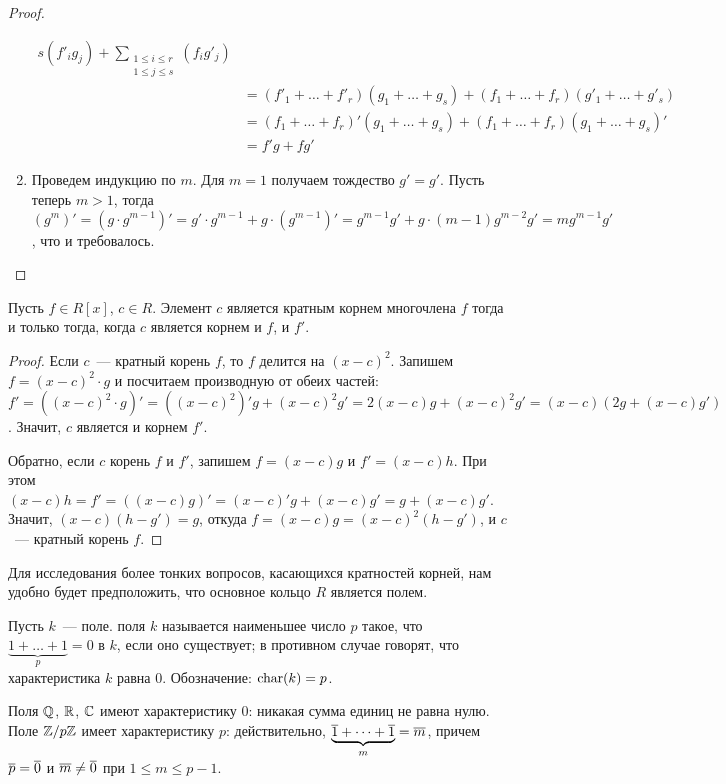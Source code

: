 \begin{proof}
\begin{enumerate}
\begin{align*}
{{    s}}(f'_ig_j) + \sum_{\substack{1\leq i\leq r\\1\leq
    j\leq s}}(f_ig'_j)\\
&=(f'_1+\dots+f'_r)(g_1+\dots+g_s)+(f_1+\dots+f_r)(g'_1+\dots+g'_s)\\
&=(f_1+\dots+f_r)'(g_1+\dots+g_s)+(f_1+\dots+f_r)(g_1+\dots+g_s)'\\
&=f'g+fg'
\end{align*}
\item Проведем индукцию по $m$. Для $m=1$ получаем тождество $g'=g'$.
Пусть теперь $m>1$, тогда $(g^m)'=(g\cdot g^{m-1})'=g'\cdot g^{m-1}
+ g\cdot (g^{m-1})'=g^{m-1}g'+g\cdot (m-1)g^{m-2}g'=mg^{m-1}g'$, что и
требовалось.
\end{enumerate}
\end{proof}

\begin{proposition}\label{prop_roots_and_derivative}
Пусть $f\in R[x]$, $c\in R$. Элемент $c$ является кратным корнем
многочлена $f$ тогда и только тогда, когда $c$ является корнем и $f$,
и $f'$.
\end{proposition}
\begin{proof}
Если $c$~--- кратный корень $f$, то $f$ делится на $(x-c)^2$. Запишем
$f=(x-c)^2\cdot g$ и посчитаем производную от обеих частей:
$f'=((x-c)^2\cdot g)' = ((x-c)^2)'g+(x-c)^2g' = 2(x-c)g+(x-c)^2g' =
(x-c)(2g+(x-c)g')$.
Значит, $c$ является и корнем $f'$.

Обратно, если $c$ корень $f$ и $f'$, запишем $f=(x-c)g$ и $f'=(x-c)h$.
При этом $(x-c)h=f'=((x-c)g)'=(x-c)'g+(x-c)g'=g+(x-c)g'$. Значит,
$(x-c)(h-g')=g$, откуда $f=(x-c)g=(x-c)^2(h-g')$, и $c$~--- кратный
корень $f$.
\end{proof}

Для исследования более тонких вопросов, касающихся кратностей корней,
нам удобно будет предположить, что основное кольцо $R$ является полем.

\begin{definition}
Пусть $k$~--- поле. 
поля $k$ называется
наименьшее число $p$ такое, что $\underbrace{1+\dots+1}_{p}=0$ в $k$,
если оно существует; в противном случае говорят, что характеристика
$k$ равна $0$. Обозначение: $\operatorname{char}(k)=p$.
\end{definition}

\begin{examples}
Поля $\mathbb Q$, $\mathbb R$, $\mathbb C$ имеют характеристику $0$: никакая сумма
единиц не равна нулю. Поле $\mathbb
Z/p\mathbb Z$ имеет характеристику $p$: действительно,
$\underbrace{\overline{1}+\dots+\overline{1}}_{m}=\overline{m}$, причем
$\overline{p}=\overline{0}$ и $\overline{m}\neq\overline{0}$ при $1\leq m\leq p-1$.
\end{examples}


